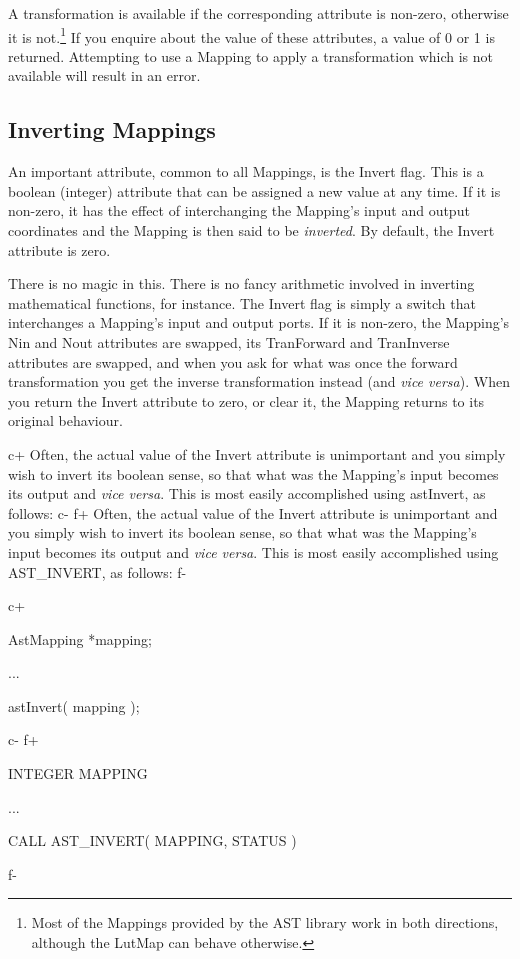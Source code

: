 \documentclass[twoside,11pt]{starlink}
\begin{document}
A transformation is available if the corresponding attribute is
non-zero, otherwise it is not.\footnote{Most of the Mappings provided
by the AST library work in both directions, although the LutMap can
behave otherwise.} If you enquire about the value of these attributes,
a value of 0 or 1 is returned.  Attempting to use a Mapping to apply a
transformation which is not available will result in an error.

\subsection{\label{ss:invertingmappings}Inverting Mappings}

An important attribute, common to all Mappings, is the Invert
flag. This is a boolean (integer) attribute that can be assigned a new
value at any time. If it is non-zero, it has the effect of
interchanging the Mapping's input and output coordinates and the
Mapping is then said to be \emph{inverted}. By default, the Invert
attribute is zero.

There is no magic in this. There is no fancy arithmetic involved in
inverting mathematical functions, for instance. The Invert flag is
simply a switch that interchanges a Mapping's input and output
ports. If it is non-zero, the Mapping's Nin and Nout attributes are
swapped, its TranForward and TranInverse attributes are swapped, and
when you ask for what was once the forward transformation you get the
inverse transformation instead (and \emph{vice versa}). When you
return the Invert attribute to zero, or clear it, the Mapping returns
to its original behaviour.

c+
Often, the actual value of the Invert attribute is unimportant and you
simply wish to invert its boolean sense, so that what was the
Mapping's input becomes its output and \emph{vice versa}. This is most
easily accomplished using astInvert, as follows:
c-
f+
Often, the actual value of the Invert attribute is unimportant and you
simply wish to invert its boolean sense, so that what was the
Mapping's input becomes its output and \emph{vice versa}. This is most
easily accomplished using AST\_INVERT, as follows:
f-

c+
\small
\begin{terminalv}
AstMapping *mapping;

...

astInvert( mapping );
\end{terminalv}
\normalsize
c-
f+
\small
\begin{terminalv}
      INTEGER MAPPING

      ...

      CALL AST_INVERT( MAPPING, STATUS )
\end{terminalv}
\normalsize
f-
\end{document}
